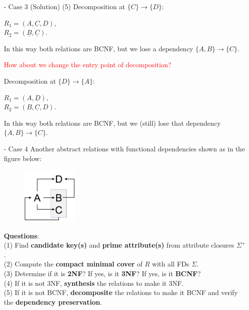 \begin{frame}[fragile]{ - Case 3 (Solution)}
	(5) Decomposition at $\{C\} \rightarrow \{D\}$:\\\vspace{5pt}
	
	$R_1 = (A, \underline{C}, D),$\\
	$R_2 = (\underline{B}, \underline{C}).$\\\vspace{5pt}
	
	In this way both relations are BCNF, but we lose a dependency $\{A, B\} \rightarrow \{C\}$.\\\vspace{5pt}
	
	\textcolor{red}{How about we change the entry point of decomposition?}\\\vspace{5pt}
	
	Decomposition at $\{D\} \rightarrow \{A\}$:\\\vspace{5pt}
	
	$R_1 = (A, \underline{D}),$\\
	$R_2 = (B, \underline{C}, D).$\\\vspace{5pt}
	
	In this way both relations are BCNF, but we (still) lose that dependency $\{A, B\} \rightarrow \{C\}$.
\end{frame}

\begin{frame}[fragile]{ - Case 4}
	Another abstract relations with functional dependencies shown as in the figure below:\\\vspace{-5pt}
	
	\begin{figure}
		\includegraphics[width=0.25\textwidth, trim=0 0 0 0, clip]{t5/images/case4.png}
	\end{figure}\vspace{-5pt}
	
	\textbf{Questions}:\\
	(1) Find \textbf{candidate key(s)} and \textbf{prime attribute(s)} from attribute closures $\Sigma^{+}$.\\
	(2) Compute the \textbf{compact minimal cover} of $R$ with all FDs $\Sigma$.\\
	(3) Determine if it is \textbf{2NF}? If yes, is it \textbf{3NF}? If yes, is it \textbf{BCNF}?\\
	(4) If it is not 3NF, \textbf{synthesis} the relations to make it 3NF.\\
	(5) If it is not BCNF, \textbf{decomposite} the relations to make it BCNF and verify the \textbf{dependency preservation}. 
\end{frame}


